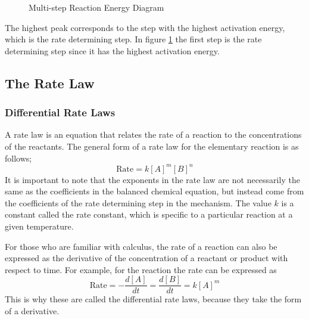 \begin{figure}[h]
    \centering
    \caption{Multi-step Reaction Energy Diagram}
    \label{fig:MultiStepReactionEnergyDiagram}
\end{figure}
The highest peak corresponds to the step with the highest activation energy, which is the rate determining step. In figure \ref{fig:MultiStepReactionEnergyDiagram} the first step is the rate determining step since it has the highest activation energy.
\subsection{The Rate Law}
\subsubsection{Differential Rate Laws}
A rate law is an equation that relates the rate of a reaction to the concentrations of the reactants. The general form of a rate law for the elementary reaction  is as follows;
\begin{equation}\label{eq:rateLaw}
    \text{Rate} = k[A]^m[B]^n
\end{equation}
It is important to note that the exponents in the rate law are not necessarily the same as the coefficients in the balanced chemical equation, but instead come from the coefficients of the rate determining step in the mechanism. The value $k$ is a constant called the rate constant, which is specific to a particular reaction at a given temperature. 

For those who are familiar with calculus, the rate of a reaction can also be expressed as the derivative of the concentration of a reactant or product with respect to time. For example, for the reaction  the rate can be expressed as
\begin{equation}\label{eq:differentialRateLaw}
    \text{Rate} = -\frac{d[A]}{dt} = \frac{d[B]}{dt} = k[A]^m
\end{equation}
This is why these are called the differential rate laws, because they take the form of a derivative.

